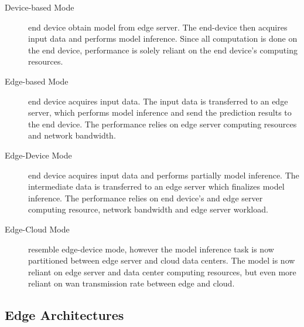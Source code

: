 \begin{description}
	\item[Device-based Mode]
	 end device obtain model from edge server. The end-device then acquires input data and performs model inference. Since all computation is done on the end device, performance is solely reliant on the end device's computing resources. 
	
	\item[Edge-based Mode] end device acquires input data. The input data is transferred to an edge server, which performs model inference and send the prediction results to the end device. The performance relies on edge server computing resources and network bandwidth.
	\item[Edge-Device Mode] end device acquires input data and performs partially model inference. The intermediate data is transferred to an edge server which finalizes model inference. The performance relies on end device's and edge server computing resource, network bandwidth and edge server workload. 
	\item[Edge-Cloud Mode] resemble edge-device mode, however the model inference task is now partitioned between edge server and cloud data centers. The model is now reliant on edge server and data center computing resources, but even more reliant on \gls{wan} transmission rate between edge and cloud. 
\end{description}

\newpage
\subsection{Edge Architectures}
 
